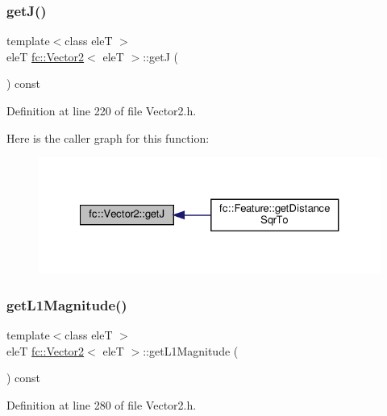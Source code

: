 \subsubsection{\texorpdfstring{get\+J()}{getJ()}}
{\footnotesize\ttfamily template$<$class eleT $>$ \\
eleT \hyperlink{classfc_1_1Vector2}{fc\+::\+Vector2}$<$ eleT $>$\+::getJ (\begin{DoxyParamCaption}{ }\end{DoxyParamCaption}) const}



Definition at line 220 of file Vector2.\+h.

Here is the caller graph for this function\+:
\nopagebreak
\begin{figure}[H]
\begin{center}
\leavevmode
\includegraphics[width=327pt]{d9/d08/classfc_1_1Vector2_a0befaabdafcb34ab8c3bc0063d0b94a3_icgraph}
\end{center}
\end{figure}
\mbox{\label{classfc_1_1Vector2_ac00492b982cddd75f43a2f1a00f29dbe}} 
\subsubsection{\texorpdfstring{get\+L1\+Magnitude()}{getL1Magnitude()}}
{\footnotesize\ttfamily template$<$class eleT $>$ \\
eleT \hyperlink{classfc_1_1Vector2}{fc\+::\+Vector2}$<$ eleT $>$\+::get\+L1\+Magnitude (\begin{DoxyParamCaption}{ }\end{DoxyParamCaption}) const}



Definition at line 280 of file Vector2.\+h.

\mbox{\label{classfc_1_1Vector2_a6df1b13d81c9e0574beb9fdc90c23deb}} 
